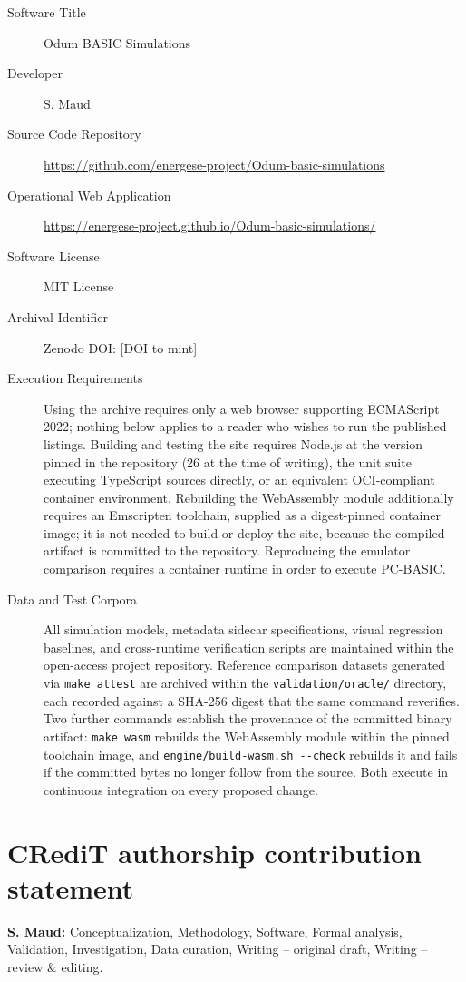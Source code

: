 \documentclass[3p,times,authoryear,twocolumn]{elsarticle}
\begin{document}
\begin{description}
\item[Software Title] Odum BASIC Simulations
\item[Developer] S. Maud
\item[Source Code Repository] \url{https://github.com/energese-project/Odum-basic-simulations}
\item[Operational Web Application] \url{https://energese-project.github.io/Odum-basic-simulations/}
\item[Software License] MIT License
\item[Archival Identifier] Zenodo DOI: [DOI to mint]
\item[Execution Requirements] Using the archive requires only a web browser supporting ECMAScript 2022; nothing below applies to a reader who wishes to run the published listings. Building and testing the site requires Node.js at the version pinned in the repository (26 at the time of writing), the unit suite executing TypeScript sources directly, or an equivalent OCI-compliant container environment. Rebuilding the WebAssembly module additionally requires an Emscripten toolchain, supplied as a digest-pinned container image; it is not needed to build or deploy the site, because the compiled artifact is committed to the repository. Reproducing the emulator comparison requires a container runtime in order to execute PC-BASIC.
\item[Data and Test Corpora] All simulation models, metadata sidecar specifications, visual regression baselines, and cross-runtime verification scripts are maintained within the open-access project repository. Reference comparison datasets generated via \texttt{make attest} are archived within the \texttt{validation/oracle/} directory, each recorded against a SHA-256 digest that the same command reverifies. Two further commands establish the provenance of the committed binary artifact: \texttt{make wasm} rebuilds the WebAssembly module within the pinned toolchain image, and \texttt{engine/build-wasm.sh -{}-check} rebuilds it and fails if the committed bytes no longer follow from the source. Both execute in continuous integration on every proposed change.
\end{description}

\section*{CRediT authorship contribution statement}
\textbf{S. Maud:} Conceptualization, Methodology, Software, Formal analysis, Validation, Investigation, Data curation, Writing -- original draft, Writing -- review \& editing.
\end{document}
